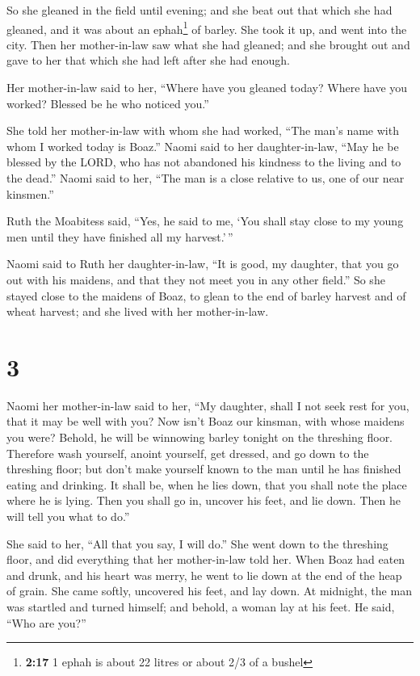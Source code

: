  So she gleaned in the field until evening; and she beat
out that which she had gleaned, and it was about an ephah\footnote{\textbf{2:17}
  1 ephah is about 22 litres or about 2/3 of a bushel} of barley.
 She took it up, and went into the city. Then her
mother-in-law saw what she had gleaned; and she brought out and gave to
her that which she had left after she had enough.

 Her mother-in-law said to her, ``Where have you gleaned
today? Where have you worked? Blessed be he who noticed you.''

She told her mother-in-law with whom she had worked, ``The man's name
with whom I worked today is Boaz.''  Naomi said to her
daughter-in-law, ``May he be blessed by the LORD, who has not abandoned
his kindness to the living and to the dead.'' Naomi said to her, ``The
man is a close relative to us, one of our near kinsmen.''

 Ruth the Moabitess said, ``Yes, he said to me, `You
shall stay close to my young men until they have finished all my
harvest.'\,''

 Naomi said to Ruth her daughter-in-law, ``It is good, my
daughter, that you go out with his maidens, and that they not meet you
in any other field.''  So she stayed close to the maidens
of Boaz, to glean to the end of barley harvest and of wheat harvest; and
she lived with her mother-in-law.

\hypertarget{section-2}{%
\section{3}\label{section-2}}

 Naomi her mother-in-law said to her, ``My daughter, shall
I not seek rest for you, that it may be well with you? 
Now isn't Boaz our kinsman, with whose maidens you were? Behold, he will
be winnowing barley tonight on the threshing floor. 
Therefore wash yourself, anoint yourself, get dressed, and go down to
the threshing floor; but don't make yourself known to the man until he
has finished eating and drinking.  It shall be, when he
lies down, that you shall note the place where he is lying. Then you
shall go in, uncover his feet, and lie down. Then he will tell you what
to do.''

 She said to her, ``All that you say, I will do.''
 She went down to the threshing floor, and did everything
that her mother-in-law told her.  When Boaz had eaten and
drunk, and his heart was merry, he went to lie down at the end of the
heap of grain. She came softly, uncovered his feet, and lay down.
 At midnight, the man was startled and turned himself; and
behold, a woman lay at his feet.  He said, ``Who are
you?''

